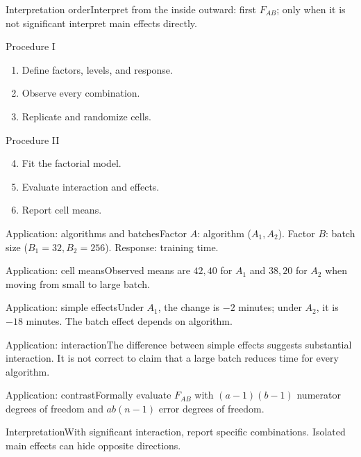 \documentclass[10pt,aspectratio=169]{beamer}
\begin{document}
\begin{frame}{Interpretation order}\small Interpret from the inside outward: first $F_{AB}$; only when it is not significant interpret main effects directly.\end{frame}
\begin{frame}{Procedure I}\small\begin{enumerate}\item Define factors, levels, and response.\item Observe every combination.\item Replicate and randomize cells.\end{enumerate}\end{frame}
\begin{frame}{Procedure II}\small\begin{enumerate}\setcounter{enumi}{3}\item Fit the factorial model.\item Evaluate interaction and effects.\item Report cell means.\end{enumerate}\end{frame}
\begin{frame}{Application: algorithms and batches}\small Factor $A$: algorithm ($A_1,A_2$). Factor $B$: batch size ($B_1=32,B_2=256$). Response: training time.\end{frame}
\begin{frame}{Application: cell means}\small Observed means are $42,40$ for $A_1$ and $38,20$ for $A_2$ when moving from small to large batch.\end{frame}
\begin{frame}{Application: simple effects}\small Under $A_1$, the change is $-2$ minutes; under $A_2$, it is $-18$ minutes. The batch effect depends on algorithm.\end{frame}
\begin{frame}{Application: interaction}\small The difference between simple effects suggests substantial interaction. It is not correct to claim that a large batch reduces time for every algorithm.\end{frame}
\begin{frame}{Application: contrast}\small Formally evaluate $F_{AB}$ with $(a-1)(b-1)$ numerator degrees of freedom and $ab(n-1)$ error degrees of freedom.\end{frame}
\begin{frame}{Interpretation}\small With significant interaction, report specific combinations. Isolated main effects can hide opposite directions.\end{frame}
\end{document}
